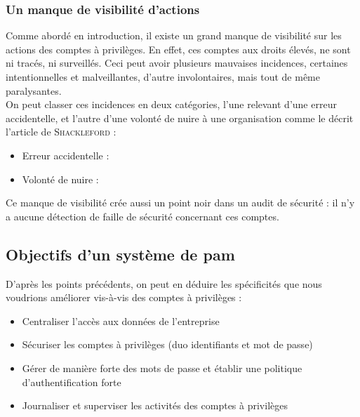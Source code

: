 \subsubsection{Un manque de visibilité d'actions} Comme abordé en introduction, il existe un grand manque de visibilité sur les actions des comptes à privilèges. En effet, ces comptes aux droits élevés, ne sont ni tracés, ni surveillés. Ceci peut avoir plusieurs mauvaises incidences, certaines intentionnelles et malveillantes, d'autre involontaires, mais tout de même paralysantes.\\
On peut classer ces incidences en deux catégories, l'une relevant d'une erreur accidentelle, et l'autre d'une volonté de nuire à une organisation comme le décrit l'article de \textsc{Shackleford} \cite{dsh} :
\begin{itemize}
	\item Erreur accidentelle :
	\item Volonté de nuire :
\end{itemize}

Ce manque de  visibilité crée aussi un point noir dans un audit de sécurité : il n'y a aucune détection de faille de sécurité concernant ces comptes.

\subsection{Objectifs d'un système de \gls{pam}}

D'après les points précédents, on peut en déduire les spécificités que nous voudrions améliorer vis-à-vis des comptes à privilèges :
\begin{itemize}
	\item Centraliser l’accès aux données de l’entreprise
 	\item Sécuriser les comptes à privilèges (duo identifiants et mot de passe)
 	\item Gérer de manière forte des mots de passe et établir une politique d’authentification forte
	\item Journaliser et superviser les activités des comptes à privilèges
\end{itemize}

